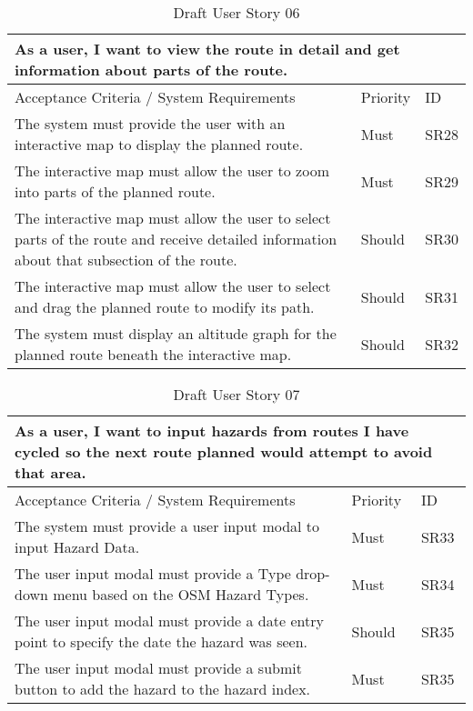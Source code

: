 \begin{table}[!htb]
\caption{Draft User Story 06}
\label{appendix:tab:user-story-06}
\begin{tabular}{ p{11cm} p{1cm}  p{1cm} }
\hline
\multicolumn{3}{p{13cm}}{As a user, I want to view the route in detail and get information about parts of the route.}\\ 
\hline
Acceptance Criteria / System Requirements & Priority & ID\\
\hline
The system must provide the user with an interactive map to display the planned route. & Must & SR28 \\
The interactive map must allow the user to zoom into parts of the planned route. & Must & SR29\\
The interactive map must allow the user to select parts of the route and receive detailed information about that subsection of the route. & Should & SR30\\
The interactive map must allow the user to select and drag the planned route to modify its path. & Should & SR31\\ 
The system must display an altitude graph for the planned route beneath the interactive map. & Should & SR32\\ 
\hline
\end{tabular}
\end{table}

\begin{table}[!htb]
\caption{Draft User Story 07}
\label{appendix:tab:user-story-07}
\begin{tabular}{ p{11cm} p{1cm}  p{1cm} }
\hline
\multicolumn{3}{p{13cm}}{As a user, I want to input hazards from routes I have cycled so the next route planned would attempt to avoid that area.}\\ 
\hline
Acceptance Criteria / System Requirements & Priority & ID\\
\hline
The system must provide a user input modal to input Hazard Data. & Must & SR33 \\
The user input modal must provide a Type drop-down menu based on the OSM Hazard Types. & Must & SR34\\
The user input modal must provide a date entry point to specify the date the hazard was seen. & Should & SR35\\
The user input modal must provide a submit button to add the hazard to the hazard index. & Must & SR35\\ 
\hline
\end{tabular}
\end{table}